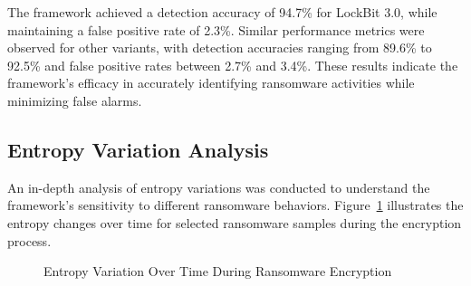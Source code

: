 \documentclass[lettersize,journal]{IEEEtran}
\begin{document}
The framework achieved a detection accuracy of 94.7\% for LockBit 3.0, while maintaining a false positive rate of 2.3\%. Similar performance metrics were observed for other variants, with detection accuracies ranging from 89.6\% to 92.5\% and false positive rates between 2.7\% and 3.4\%. These results indicate the framework's efficacy in accurately identifying ransomware activities while minimizing false alarms.

\subsection{Entropy Variation Analysis}

An in-depth analysis of entropy variations was conducted to understand the framework's sensitivity to different ransomware behaviors. Figure~\ref{fig:entropy_variation} illustrates the entropy changes over time for selected ransomware samples during the encryption process.

\begin{figure}[h]
	\centering
	\caption{Entropy Variation Over Time During Ransomware Encryption}
	\label{fig:entropy_variation}
\end{figure}
\end{document}
